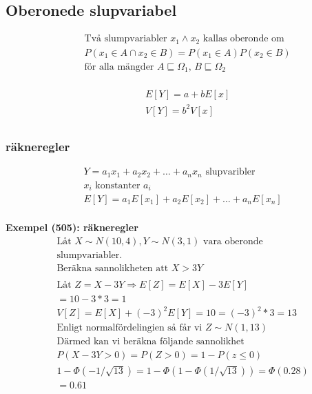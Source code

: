 \begin{multicols}{2}
\subsection{Oberonede slupvariabel}
\begin{align*}
  &\quad  \text{Två slumpvariabler $x_1 \land x_2$ kallas oberonde om} \\
  &\quad  P({x_1\in A} \cap  {x_2\in B}) = P(x_1\in A)P(x_2\in B) \\
  &\quad  \text{för alla mängder $A\sqsubseteq \Omega_1, \, B\sqsubseteq \Omega_2$} \\
\end{align*}

\begin{align*}
  &\quad  E[Y] = a+bE[x] \\
  &\quad  V[Y] = b^2V[x] \\
\end{align*}

\subsubsection{räkneregler}
\begin{align*}
  &Y = a_1x_1 + a_2x_2 + \ldots+ a_n x_n \text{ slupvaribler} \\
  &x_i \text{ konstanter } a_i \\
  &E[Y] =  a_1 E[x_1] + a_2 E[x_2] + \ldots + a_n E[x_n] \\
\end{align*}

\noindent\textbf{Exempel (505): räkneregler}
\begin{align*}
  &\text{Låt $X\sim N(10,4), Y\sim N(3,1)$ vara oberonde} \\
  &\text{slumpvariabler.} \\
  &\text{Beräkna sannolikheten att $X>3Y$} \\
  &\\
  &\text{Låt } Z=X-3Y \Rightarrow E[Z]=E[X]-3E[Y] \\
  &=10-3*3=1 \\
  &V[Z]=E[X]+(-3)^2E[Y]=10=(-3)^2*3=13 \\
  &\text{Enligt normalfördelingien så får vi } Z\sim N(1,13) \\
  &\text{Därmed kan vi beräkna följande sannolikhet} \\
  &P(X-3Y>0)=P(Z>0)=1-P(z\leq0) \\
  &1-\Phi(-1/\sqrt{13})=1-\Phi(1-\Phi(1/\sqrt{13})) = \Phi(0.28) \\
  &= 0.61 \\
\end{align*}


\end{multicols}
